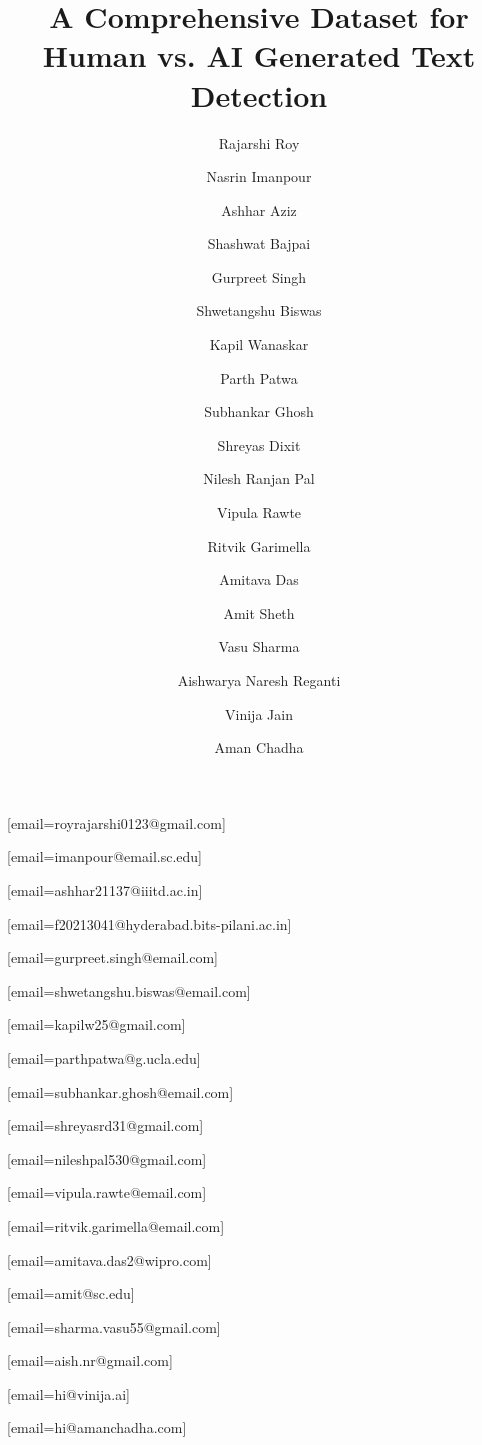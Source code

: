 \documentclass[
]{ceurart}
\begin{document}


\title{A Comprehensive Dataset for Human vs. AI Generated Text Detection}


\author[1]{Rajarshi Roy}[email=royrajarshi0123@gmail.com]
\author[2]{Nasrin Imanpour}[email=imanpour@email.sc.edu]
\author[3]{Ashhar Aziz}[email=ashhar21137@iiitd.ac.in]
\author[4]{Shashwat Bajpai}[email=f20213041@hyderabad.bits-pilani.ac.in]
\author[5]{Gurpreet Singh}[email=gurpreet.singh@email.com]
\author[6]{Shwetangshu Biswas}[email=shwetangshu.biswas@email.com]
\author[7]{Kapil Wanaskar}[email=kapilw25@gmail.com]
\author[8]{Parth Patwa}[email=parthpatwa@g.ucla.edu]
\author[9]{Subhankar Ghosh}[email=subhankar.ghosh@email.com]
\author[10]{Shreyas Dixit}[email=shreyasrd31@gmail.com]
\author[1]{Nilesh Ranjan Pal}[email=nileshpal530@gmail.com]
\author[2]{Vipula Rawte}[email=vipula.rawte@email.com]
\author[2]{Ritvik Garimella}[email=ritvik.garimella@email.com]
\author[13]{Amitava Das}[email=amitava.das2@wipro.com]
\author[2]{Amit Sheth}[email=amit@sc.edu]
\author[11]{Vasu Sharma}[email=sharma.vasu55@gmail.com]
\author[12]{Aishwarya Naresh Reganti}[email=aish.nr@gmail.com]
\author[11]{Vinija Jain}[email=hi@vinija.ai]
\author[12]{Aman Chadha}[email=hi@amanchadha.com]

\address[1]{Kalyani Government Engineering College, India}
\address[2]{AI Institute University of South Carolina, USA}
\address[3]{IIIT Delhi, India}
\address[4]{BITS Pilani Hyderabad Campus, India}
\address[5]{IIIT Guwahati, India}
\address[6]{National Institute of Technology Silchar, India}
\address[7]{San Jose State University, USA}
\address[8]{University of California Los Angeles, USA}
\address[9]{Washington State University, USA}
\address[10]{Vishwakarma Institute of Information Technology, India}
\address[11]{Meta AI, USA}
\address[12]{Amazon AI, USA}
\address[13]{BITS Pilani, Goa}
\end{document}
